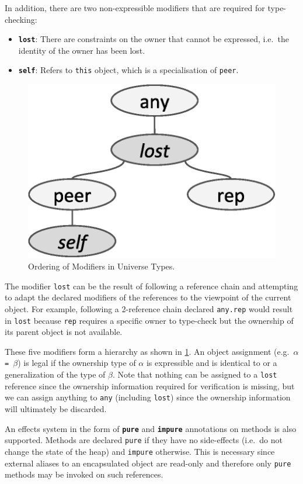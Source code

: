 \documentclass{acm_proc_article-sp}
\begin{document}
In addition, there are two non-expressible modifiers that are required for
type-checking:
\begin{itemize}
	\item \textbf{\lstinline|lost|}:
		There are constraints on the owner that cannot be expressed, i.e.\ the
		identity of the owner has been lost.
	\item \textbf{\lstinline|self|}:
		Refers to \lstinline|this| object, which is a specialisation of
		\lstinline|peer|.
\end{itemize}

\begin{figure}[t]
\centering
\includegraphics[width=0.5\linewidth]{ut-modifiers.eps}
\caption{Ordering of Modifiers in Universe Types.}
\label{fig:ut-modifiers}
\end{figure}

The modifier \lstinline|lost| can be the result of following a reference chain
and attempting to adapt the declared modifiers of the references to the
viewpoint of the current object. For example, following a 2-reference chain
declared \lstinline|any.rep| would result in \lstinline|lost| because
\lstinline|rep| requires a specific owner to type-check but the ownership of
its parent object is not available.

These five modifiers form a hierarchy as shown in \cref{fig:ut-modifiers}. An
object assignment (e.g.\ $\alpha$\lstinline| = |$\beta$) is legal if the
ownership type of $\alpha$ is expressible and is identical to or a
generalization of the type of $\beta$. Note that nothing can be assigned to a
\lstinline|lost| reference since the ownership information required for
verification is missing, but we can assign anything to \lstinline|any|
(including \lstinline|lost|) since the ownership information will ultimately be
discarded.

An effects system in the form of \textbf{\lstinline|pure|} and
\textbf{\lstinline|impure|} annotations on methods is also supported. Methods
are declared \lstinline|pure| if they have no side-effects (i.e.\ do not change
the state of the heap) and \lstinline|impure| otherwise. This is necessary
since external aliases to an encapsulated object are read-only and therefore
only \lstinline|pure| methods may be invoked on such references.
\end{document}

